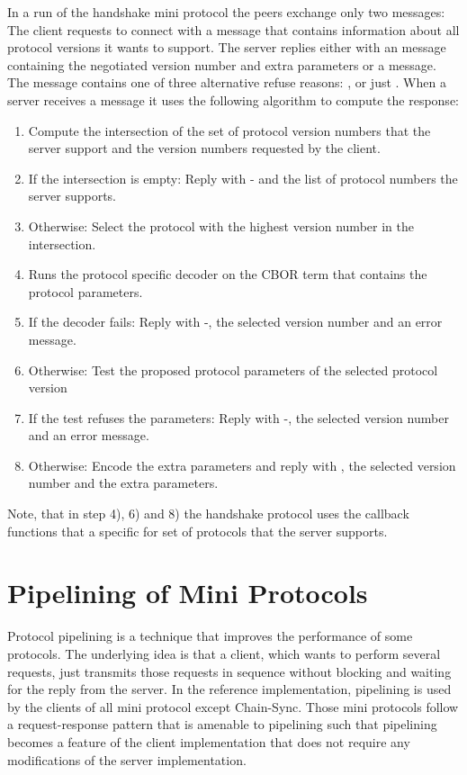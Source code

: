 \documentclass{report}
\newcommand{\wip}[1]{\color{magenta}{#1}\color{black}}
\theoremstyle{definition}{
  \newtheorem{lemma}{Lemma}[section] %
  \newtheorem{definition}[lemma]{Definition}
}
\theoremstyle{theorem}{
  \newtheorem{invariant}[lemma]{Invariant}
  \newtheorem{proofobligation}[lemma]{Proof Obligation}
}
\numberwithin{equation}{lemma}
\begin{document}
In a run of the handshake mini protocol the peers exchange only two messages:
The client requests to connect with a \ProposeVersions{} message that contains information about
all protocol versions it wants to support.
The server replies either with an \AcceptVersion{} message containing the negotiated
version number and extra parameters or a \Refuse{} message.
The \Refuse{} message contains one of three alternative refuse reasons:
\VersionMismatch{}, \HandshakeDecodeError{} or just \Refused{}.
When a server receives a \ProposeVersions{} message it uses the following algorithm to
compute the response:
\begin{enumerate}
\item
  Compute the intersection of the set of protocol version numbers that the server support
  and the version numbers requested by the client.
\item
  If the intersection is empty:
  Reply with \Refuse-\VersionMismatch{} and the list of protocol numbers the server supports.
\item
  Otherwise:
  Select the protocol with the highest version number in the intersection.
\item
  Runs the protocol specific decoder on the CBOR term that contains the protocol parameters.
\item
  If the decoder fails:
  Reply with \Refuse-\HandshakeDecodeError, the selected version number and an error message.
\item
  Otherwise: Test the proposed protocol parameters of the selected protocol version
\item
  If the test refuses the parameters:
  Reply with \Refuse-\Refused, the selected version number and an error message.
\item
  Otherwise:
  Encode the extra parameters and
  reply with \AcceptVersion, the selected version number and the extra parameters.
\end{enumerate}
Note, that in step 4), 6) and 8) the handshake protocol uses the callback functions that a specific
for set of protocols that the server supports.

\wip{
see in the code if this is still true:
The handshake mini protocol runs before the MUX/DEMUX itself is initialized.
Each message is transmitted within a single MUX segment, i.e. with a proper segment header,
but, as the MUX/DEMUX is not yet running the messages must not be split into multiple segments.
}

\section{Pipelining of Mini Protocols}
\label{pipelining}
Protocol pipelining is a technique that improves the performance of some protocols.
The underlying idea is that a client, which wants to perform several requests,
just transmits those requests in sequence without blocking and waiting for the reply from the server.
In the reference implementation, pipelining is used by the clients of all mini protocol except Chain-Sync.
Those mini protocols follow a request-response pattern that is amenable to pipelining such
that pipelining becomes a feature of the client implementation that does not require any
modifications of the server implementation.
\end{document}
